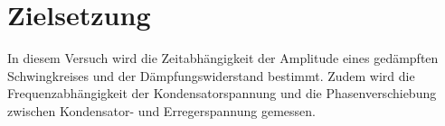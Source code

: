 \section{Zielsetzung}
\label{sec:Zielsetzung}

In diesem Versuch wird die Zeitabhängigkeit der Amplitude eines gedämpften Schwingkreises und
der Dämpfungswiderstand bestimmt. Zudem wird die Frequenzabhängigkeit
der Kondensatorspannung und die Phasenverschiebung zwischen Kondensator- und Erregerspannung gemessen.